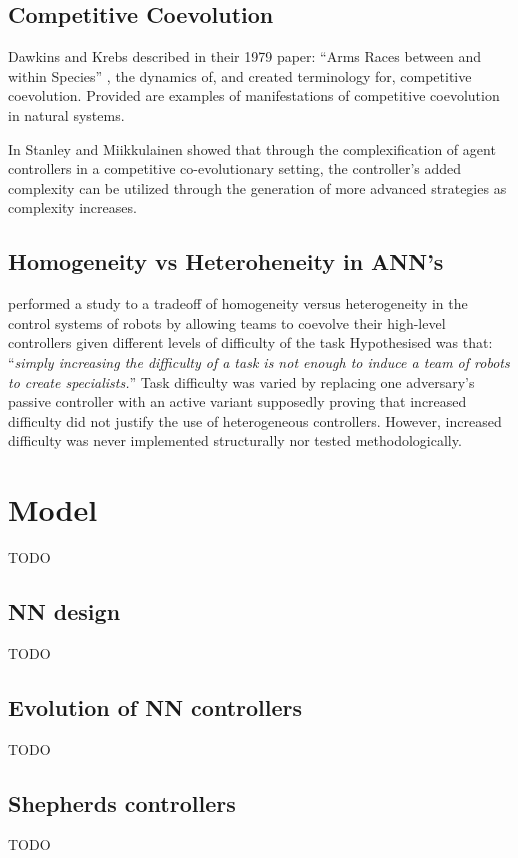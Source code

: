\documentclass[conference]{IEEEtran}
\begin{document}
\subsection{Competitive Coevolution}
Dawkins and Krebs described in their 1979 paper: ``Arms Races between and within Species'' \cite{dawkins1979arms}, the dynamics of, and created terminology for, competitive coevolution. Provided are examples of manifestations of competitive coevolution in natural systems.

In \cite{stanley2004competitive} Stanley and Miikkulainen showed that through the complexification of agent controllers in a competitive co-evolutionary setting, the controller's added complexity can be utilized through the generation of more advanced strategies as complexity increases.


\subsection{Homogeneity vs Heteroheneity in ANN's}
\cite{potter2001heterogeneity} performed a study to a tradeoff of homogeneity versus heterogeneity in the control systems of robots by allowing teams to coevolve their high-level controllers given different levels of difficulty of the task
Hypothesised was that: ``\textit{simply increasing the difficulty of a task is not enough to induce a team of robots to create specialists.}''
Task difficulty was varied by replacing one adversary's passive controller with an active variant supposedly proving that increased difficulty did not justify the use of heterogeneous controllers.
However, increased difficulty was never implemented structurally nor tested methodologically. 



\section{Model}
TODO

\subsection{NN design}
TODO

\subsection{Evolution of NN controllers}
TODO

\subsection{Shepherds controllers}
TODO
\end{document}

